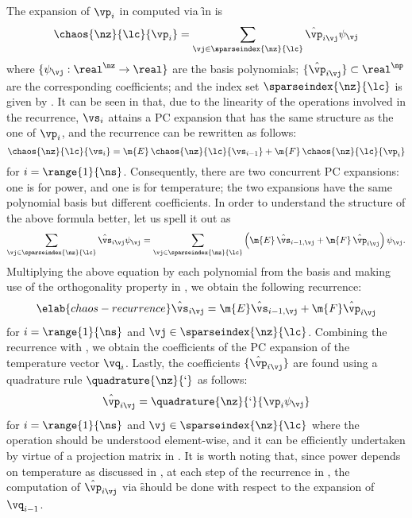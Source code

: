 The expansion of $\vp_i$ in  computed via \f in
 is
\[
  \chaos{\nz}{\lc}{\vp_i} = \sum_{\vj \in \sparseindex{\nz}{\lc}} \hat{\vp}_{i \vj} \psi_{\vj}
\]
where $\{ \psi_{\vj}: \real^\nz \to \real \}$ are the basis polynomials; $\{
\hat{\vp}_{i \vj} \} \subset \real^\np$ are the corresponding coefficients; and
the index set $\sparseindex{\nz}{\lc}$ is given by
. It can be seen in
 that, due to the linearity of the operations
involved in the recurrence, $\vs_i$ attains a \ac{PC} expansion that has the
same structure as the one of $\vp_i$, and the recurrence can be rewritten as
follows:
\[
  \chaos{\nz}{\lc}{\vs_i} = \m{E} \, \chaos{\nz}{\lc}{\vs_{i - 1}} + \m{F} \, \chaos{\nz}{\lc}{\vp_i}
\]
for $i = \range{1}{\ns}$. Consequently, there are two concurrent \ac{PC}
expansions: one is for power, and one is for temperature; the two expansions
have the same polynomial basis but different coefficients. In order to
understand the structure of the above formula better, let us spell it out as
\[
  \sum_{\vj \in \sparseindex{\nz}{\lc}} \hat{\vs}_{i \vj} \psi_{\vj} =
  \sum_{\vj \in \sparseindex{\nz}{\lc}} \left(\m{E} \, \hat{\vs}_{i - 1, \vj} + \m{F} \, \hat{\vp}_{i \vj}\right) \psi_{\vj}.
\]
Multiplying the above equation by each polynomial from the basis and making use
of the orthogonality property in , we obtain the
following recurrence:
\begin{equation} \elab{chaos-recurrence}
  \hat{\vs}_{i \vj} = \m{E} \hat{\vs}_{i - 1, \vj} + \m{F} \hat{\vp}_{i \vj}
\end{equation}
for $i = \range{1}{\ns}$ and $\vj \in \sparseindex{\nz}{\lc}$. Combining the
recurrence with , we obtain the coefficients of the
\ac{PC} expansion of the temperature vector $\vq_i$. Lastly, the coefficients
$\{ \hat{\vp}_{i \vj} \}$ are found using a quadrature rule
$\quadrature{\nz}{\lq}$ as follows:
\[
  \hat{\vp}_{i \vj} = \quadrature{\nz}{\lq}{\vp_i \psi_{\vj}}
\]
for $i = \range{1}{\ns}$ and $\vj \in \sparseindex{\nz}{\lc}$ where the
operation should be understood element-wise, and it can be efficiently
undertaken by virtue of a projection matrix in .
It is worth noting that, since power depends on temperature as discussed in
, at each step of the recurrence in ,
the computation of $\hat{\vp}_{i \vj}$ via \f should be done with respect to the
expansion of $\vq_{i - 1}$.

